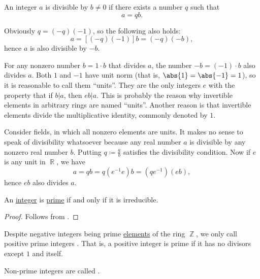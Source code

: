 \begin{remark}\label{rem:units_in_rings_etymology}
  An integer \( a \) is divisible by \( b \neq 0 \) if there exists a number \( q \) such that
  \begin{equation*}
    a = qb.
  \end{equation*}

  Obviously \( q = (-q)(-1) \), so the following also holds:
  \begin{equation*}
    a = [(-q)(-1)]b = (-q)(-b),
  \end{equation*}
  hence \( a \) is also divisible by \( -b \).

  For any nonzero number \( b = 1 \cdot b \) that divides \( a \), the number \( -b = (-1) \cdot b \) also divides \( a \). Both \( 1 \) and \( -1 \) have unit norm (that is, \( \abs{1} = \abs{-1} = 1 \)), so it is reasonable to call them \enquote{units}. They are the only integers \( e \) with the property that if \( b | a \), then \( eb | a \). This is probably the reason why invertible elements in arbitrary rings are named \enquote{units}. Another reason is that invertible elements divide the multiplicative identity, commonly denoted by \( 1 \).

  Consider fields, in which all nonzero elements are units. It makes no sense to speak of divisibility whatsoever because any real number \( a \) is divisible by any nonzero real number \( b \). Putting \( q \coloneqq \frac a b \) satisfies the divisibility condition. Now if \( e \) is any unit in \( \BbbR \), we have
  \begin{equation*}
    a = qb = q(e^{-1} e) b = (qe^{-1}) (eb),
  \end{equation*}
  hence \( eb \) also divides \( a \).
\end{remark}

\begin{lemma}\label{thm:euclids_lemma}
  An \hyperref[def:set_of_integers]{integer} is \hyperref[def:prime_ring_ideal]{prime} if and only if it is irreducible.
\end{lemma}
\begin{proof}
  Follows from .
\end{proof}

\begin{definition}\label{def:prime_number}
  Despite negative integers being prime \hyperref[thm:euclids_lemma]{elements} of the ring \( \BbbZ \), we only call positive prime integers . That is, a positive integer is prime if it has no divisors except \( 1 \) and itself.

  Non-prime integers are called .
\end{definition}

